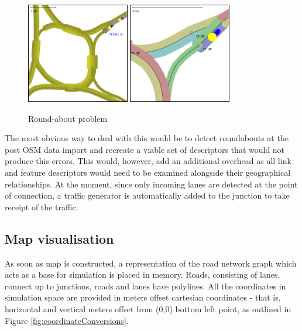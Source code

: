\begin{figure}[!h]
	\vspace{1.5em}
  	\caption{Round-about problem}
  	\label{fig:roundAbout}
  	\centering
	\includegraphics[width=0.4\textwidth]{figs/graphConstruction/RoundAbout1.png}
	\hspace{0.2em}
	\includegraphics[width=0.40\textwidth]{figs/graphConstruction/RoundAbout2.png}
  	\vspace{1.5em}
\end{figure}

The most obvious way to deal with this would be to detect roundabouts at the post OSM data import and recreate a viable set of descriptors that would not produce this errors. This would, however, add an additional overhead as all link and feature descriptors would need to be examined alongside their geographical relationships. At the moment, since only incoming lanes are detected at the point of connection, a traffic generator is automatically added to the junction to take receipt of the traffic.

\subsection{Map visualisation}
As soon as map is constructed, a representation of the road network graph which acts as a base for simulation is placed in memory. Roads, consisting of lanes, connect up to junctions, roads and lanes have polylines. All the coordinates in simulation space are provided in meters offset cartesian coordinates - that is, horizontal and vertical meters offset from (0,0) bottom left point, as outlined in Figure \ref{fig:coordinateConversions}.

